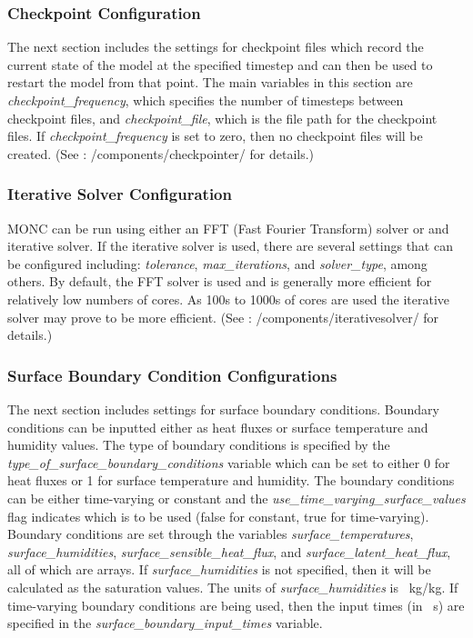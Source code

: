 \subsubsection{Checkpoint Configuration}
The next section includes the settings for checkpoint files which record the current state of the model at the specified timestep and can then be used to restart the model from that point. The main variables in this section are \textit{checkpoint\_frequency}, which specifies the number of timesteps between checkpoint files, and \textit{checkpoint\_file}, which is the file path for the checkpoint files. If \textit{checkpoint\_frequency} is set to zero, then no checkpoint files will be created. (See \cite{moncCode}: /components/checkpointer/ for details.)

\subsubsection{Iterative Solver Configuration}
MONC can be run using either an FFT (Fast Fourier Transform) solver or and iterative solver. If the iterative solver is used, there are several settings that can be configured including: \textit{tolerance}, \textit{max\_iterations}, and \textit{solver\_type}, among others. By default, the FFT solver is used and is generally more efficient for relatively low numbers of cores. As 100s to 1000s of cores are used the iterative solver may prove to be more efficient. \citep{brown2015} (See \cite{moncCode}: /components/iterativesolver/ for details.)

\subsubsection{Surface Boundary Condition Configurations}
The next section includes settings for surface boundary conditions. Boundary conditions can be inputted either as heat fluxes or surface temperature and humidity values. The type of boundary conditions is specified by the \textit{type\_of\_surface\_boundary\_conditions} variable which can be set to either 0 for heat fluxes or 1 for surface temperature and humidity. The boundary conditions can be either time-varying or constant and the \textit{use\_time\_varying\_surface\_values} flag indicates which is to be used (false for constant, true for time-varying). Boundary conditions are set through the variables \textit{surface\_temperatures}, \textit{surface\_humidities}, \textit{surface\_sensible\_heat\_flux}, and \textit{surface\_latent\_heat\_flux}, all of which are arrays. If \textit{surface\_humidities} is not specified, then it will be calculated as the saturation values. The units of \textit{surface\_humidities} is \SI{}{kg/kg}. If time-varying boundary conditions are being used, then the input times (in \SI{}{s}) are specified in the \textit{surface\_boundary\_input\_times} variable. \citep{moncCode}

